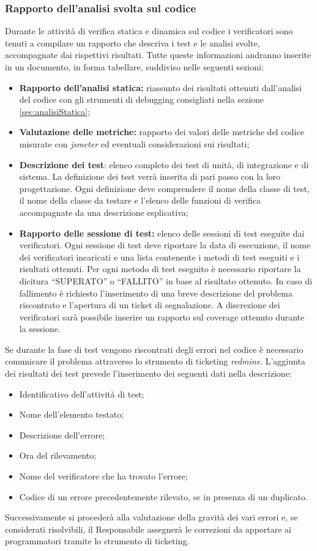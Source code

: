  \subsubsection{Rapporto dell’analisi svolta sul codice}
  Durante le attività di verifica statica e dinamica sul codice i verificatori sono tenuti a compilare un rapporto che descriva i test e le analisi svolte, accompagnate dai rispettivi risultati. Tutte queste informazioni andranno inserite in un documento, in forma tabellare, suddiviso nelle seguenti sezioni:
  \begin{itemize}
 \item \textbf{Rapporto dell’analisi statica:} riassunto dei risultati ottenuti dall’analisi del codice con gli strumenti di debugging consigliati nella sezione \ref{sec:analisiStatica};
  
  \item \textbf{Valutazione delle metriche:} rapporto dei valori delle metriche del codice misurate con \emph{jsmeter} ed eventuali considerazioni sui risultati;
  \item \textbf{Descrizione dei test}: elenco completo dei test di unità, di integrazione e di sistema. La definizione dei test verrà inserita di pari passo con la loro progettazione.
  Ogni definizione deve comprendere il nome della classe di test, il nome della classe da testare e l’elenco delle funzioni di verifica accompagnate da una descrizione esplicativa;
  \item \textbf{Rapporto delle sessione di test:} elenco delle sessioni di test eseguite dai verificatori. Ogni sessione di test deve riportare la data di esecuzione, il nome dei verificatori incaricati e una lista contenente i metodi di test eseguiti e i risultati ottenuti. Per ogni metodo di test eseguito è necessario riportare la dicitura “SUPERATO” o “FALLITO” in base al risultato ottenuto. In caso
  di fallimento è richiesto l’inserimento di una breve descrizione del problema riscontrato e l’apertura di un ticket di segnalazione. A discrezione dei verificatori sarà possibile inserire un rapporto sul coverage ottenuto durante la  sessione.
 \end{itemize} 
  Se durante la fase di test vengono riscontrati degli errori nel codice è necessario comunicare il problema attraverso lo strumento di ticketing \emph{redmine}.
  L’aggiunta dei risultati dei test prevede l’inserimento dei seguenti dati nella  descrizione:
  \begin{itemize}
  \item Identificativo dell’attività di test;
  \item Nome dell’elemento testato;
  \item Descrizione dell’errore;
  \item Ora del rilevamento;
  \item Nome del verificatore che ha trovato l’errore;
  \item Codice di un errore precedentemente rilevato, se in presenza di un duplicato.
 \end{itemize}
  Successivamente si procederà alla valutazione della gravità dei vari errori e, se considerati risolvibili, il Responsabile assegnerà le correzioni da apportare ai programmatori tramite lo strumento di ticketing.